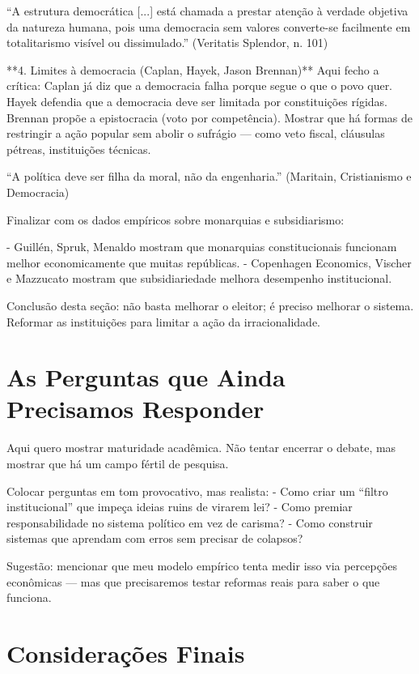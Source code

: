“A estrutura democrática [...] está chamada a prestar atenção à verdade objetiva da natureza humana, pois uma democracia sem valores converte-se facilmente em totalitarismo visível ou dissimulado.” (Veritatis Splendor, n. 101)

**4. Limites à democracia (Caplan, Hayek, Jason Brennan)**  
Aqui fecho a crítica: Caplan já diz que a democracia falha porque segue o que o povo quer. Hayek defendia que a democracia deve ser limitada por constituições rígidas. Brennan propõe a epistocracia (voto por competência). Mostrar que há formas de restringir a ação popular sem abolir o sufrágio — como veto fiscal, cláusulas pétreas, instituições técnicas.

“A política deve ser filha da moral, não da engenharia.” (Maritain, Cristianismo e Democracia)

Finalizar com os dados empíricos sobre monarquias e subsidiarismo:

- Guillén, Spruk, Menaldo mostram que monarquias constitucionais funcionam melhor economicamente que muitas repúblicas.
- Copenhagen Economics, Vischer e Mazzucato mostram que subsidiariedade melhora desempenho institucional.
  
Conclusão desta seção: não basta melhorar o eleitor; é preciso melhorar o sistema. Reformar as instituições para limitar a ação da irracionalidade.

\section{As Perguntas que Ainda Precisamos Responder} 

Aqui quero mostrar maturidade acadêmica. Não tentar encerrar o debate, mas mostrar que há um campo fértil de pesquisa.

Colocar perguntas em tom provocativo, mas realista:
- Como criar um “filtro institucional” que impeça ideias ruins de virarem lei?
- Como premiar responsabilidade no sistema político em vez de carisma?
- Como construir sistemas que aprendam com erros sem precisar de colapsos?

Sugestão: mencionar que meu modelo empírico tenta medir isso via percepções econômicas — mas que precisaremos testar reformas reais para saber o que funciona.

\section{Considerações Finais} %

